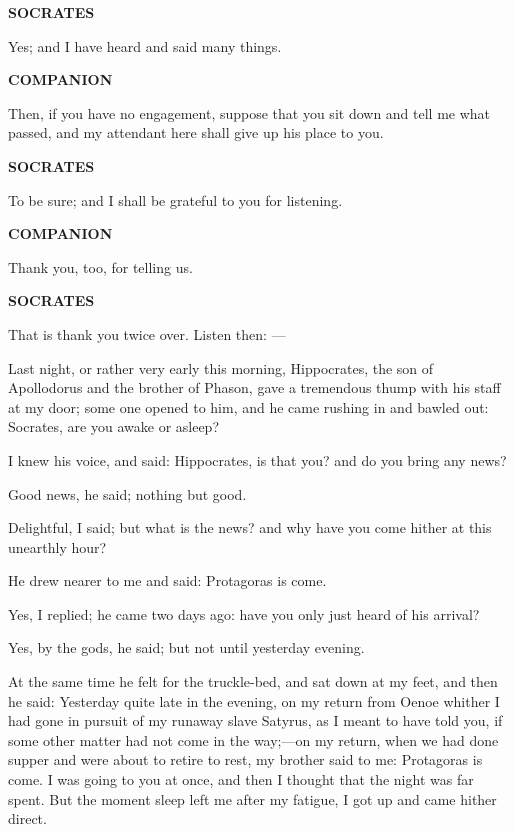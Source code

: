 \documentclass[11pt,letter]{article}
\begin{document}
\par \textbf{SOCRATES}
\par   Yes; and I have heard and said many things.

\par \textbf{COMPANION}
\par   Then, if you have no engagement, suppose that you sit down and tell me what passed, and my attendant here shall give up his place to you.

\par \textbf{SOCRATES}
\par   To be sure; and I shall be grateful to you for listening.

\par \textbf{COMPANION}
\par   Thank you, too, for telling us.

\par \textbf{SOCRATES}
\par   That is thank you twice over. Listen then: —

\par  Last night, or rather very early this morning, Hippocrates, the son of Apollodorus and the brother of Phason, gave a tremendous thump with his staff at my door; some one opened to him, and he came rushing in and bawled out: Socrates, are you awake or asleep?

\par  I knew his voice, and said: Hippocrates, is that you? and do you bring any news?

\par  Good news, he said; nothing but good.

\par  Delightful, I said; but what is the news? and why have you come hither at this unearthly hour?

\par  He drew nearer to me and said: Protagoras is come.

\par  Yes, I replied; he came two days ago: have you only just heard of his arrival?

\par  Yes, by the gods, he said; but not until yesterday evening.

\par  At the same time he felt for the truckle-bed, and sat down at my feet, and then he said: Yesterday quite late in the evening, on my return from Oenoe whither I had gone in pursuit of my runaway slave Satyrus, as I meant to have told you, if some other matter had not come in the way;—on my return, when we had done supper and were about to retire to rest, my brother said to me: Protagoras is come. I was going to you at once, and then I thought that the night was far spent. But the moment sleep left me after my fatigue, I got up and came hither direct.
\end{document}
